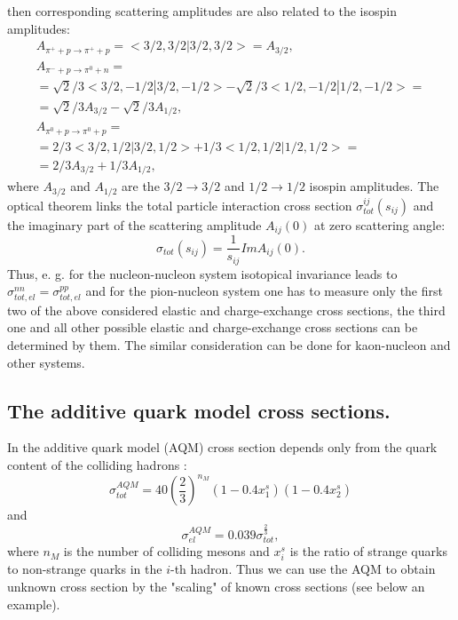 then corresponding scattering amplitudes are also related to the isospin
amplitudes:
\begin{equation}
\label{CCS5}
\begin{array}{ccccccc}
A_{\pi^{+} + p \rightarrow \pi^{+} + p}= 
<3/2, 3/2|3/2, 3/2> = A_{3/2},\\
A_{\pi^{-} + p \rightarrow \pi^{0} + n} = \\
=\sqrt{2}/3<3/2, -1/2|3/2, -1/2>  - 
\sqrt{2}/3<1/2, -1/2|1/2, -1/2>= \\
=\sqrt{2}/3A_{3/2} -\sqrt{2}/3A_{1/2},\\
A_{\pi^{0} + p \rightarrow \pi^{0} + p}= \\
=2/3<3/2, 1/2|3/2, 1/2> + 1/3<1/2, 1/2|1/2, 1/2> = \\
=2/3A_{3/2}+1/3A_{1/2},
\end{array}
\end{equation}
where $A_{3/2}$ and $A_{1/2}$ are the $3/2\rightarrow 3/2$ and
$1/2\rightarrow 1/2$ isospin amplitudes. The optical theorem links the
total particle interaction cross section $\sigma^{ij}_{tot}(s_{ij})$ and
the imaginary part of the scattering amplitude $A_{ij}(0)$ at zero
scattering angle:
\begin{equation}
\label{CCS6} \sigma_{tot}(s_{ij}) = \frac{1}{s_{ij}}Im A_{ij}(0).
\end{equation}
Thus, e. g. for the nucleon-nucleon system isotopical invariance leads
to $\sigma^{nn}_{tot,el} = \sigma^{pp}_{tot,el}$ and for the
pion-nucleon system one has to measure only the first two of the above
considered elastic and charge-exchange cross sections, the third one and
all other possible elastic and charge-exchange cross sections can be
determined by them. The similar consideration can be done for
kaon-nucleon and other systems.

\subsection{The additive quark model cross sections.}

\hspace{1.0em}
In the additive quark model (AQM) cross section depends only
from the quark content of the colliding hadrons \cite{Goulianos83}:
\begin{equation}
\label{CCS7}\sigma^{AQM}_{tot}=40 (\frac{2}{3})^{n_{M}}(1 - 0.4 x^s_1)(1-0.4 
x^s_2)
\end{equation}
and
\begin{equation}
\label{CCS8}\sigma^{AQM}_{el}=0.039\sigma_{tot}^{\frac{2}{3}},
\end{equation}
where $n_{M}$ is the number of colliding mesons and $x^s_i$ is the 
ratio of strange quarks to non-strange quarks in the $i$-th hadron.
Thus we can use the AQM  to obtain unknown cross section by the 
 "scaling" of known cross sections (see below an example).

